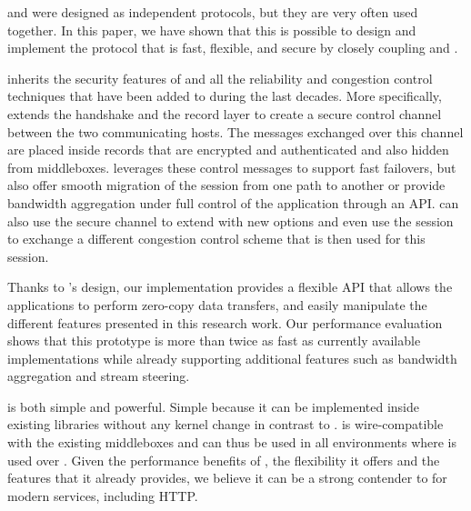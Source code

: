 \tcp and \tls were designed as independent protocols, but they are very often
used together. In this paper, we have shown that this is possible to design and
implement the \tcpls protocol that is fast, flexible, and secure by closely
coupling \tcp and \tls.

\tcpls inherits the security features of  and all the reliability and
congestion control techniques that have been added to \tcp during the last
decades. More specifically, \tcpls extends the  handshake and the record
layer to create a secure control channel between the two communicating hosts.
The messages exchanged over this channel are placed inside \tls records that are
encrypted and authenticated and also hidden from middleboxes. \tcpls leverages
these control messages to support fast failovers, but also offer smooth
migration of the \tcpls session from one path to another or provide bandwidth
aggregation under full control of the application through an API. \tcpls can
also use the secure channel to extend \tcp with new options and even use the
\tcpls session to exchange a different congestion control scheme that is then
used for this session.

Thanks to \tcpls's design, our \tcpls implementation provides a
flexible API that allows the applications to perform zero-copy data transfers,
and easily manipulate the different features presented in this research work.
Our performance evaluation shows that this prototype is more than twice as fast
as currently available \quic implementations while already supporting additional
features such as bandwidth aggregation and stream steering.

\tcpls is both simple and powerful. Simple because it can be implemented inside
existing \tls libraries without any kernel change in contrast to \tcp. \tcpls is
wire-compatible with the existing \tcp middleboxes and can thus be used in all
environments where \tls is used over \tcp. Given the performance benefits of
\tcpls, the flexibility it offers and the features that it already provides, we
believe it can be a strong contender to \quic for modern services, including
HTTP.

